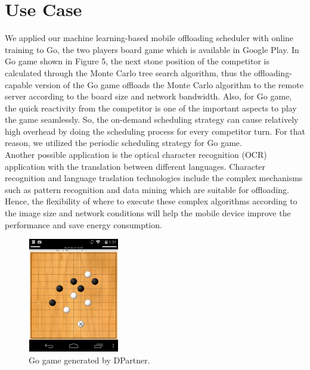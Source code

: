 \documentclass[10pt, conference, compsocconf]{IEEEtran}
\begin{document}
{\section{Use Case}
%
We applied our machine learning-based mobile offloading scheduler with
online training to Go, the two players board game which is available in
Google Play.
%
In Go game shown in Figure 5, the next stone position of the competitor
is calculated through the Monte Carlo tree search algorithm, thus the
offloading-capable version of the Go game offloads the Monte Carlo
algorithm to the remote server according to the board size and network
bandwidth.
%
Also, for Go game, the quick reactivity from the competitor is one of
the important aspects to play the game seamlessly.
%
So, the on-demand scheduling strategy can cause relatively high overhead
by doing the scheduling process for every competitor turn.
%
For that reason, we utilized the periodic scheduling strategy for Go
game.\\
%
\indent Another possible application is the optical character
recognition (OCR) application with the translation between different
languages.
%
Character recognition and language traslation technologies include
the complex mechanisms such as pattern recognition and data mining which
are suitable for offloading.
%
Hence, the flexibility of where to execute these complex algorithms
according to the image size and network conditions will help the mobile
device improve the performance and save energy consumption.
%
\begin{figure}
\centering
\includegraphics[height=5.0cm, width=4.0cm]{Figure/figure7}
\caption{Go game generated by DPartner.}
\end{figure}
%
}
\end{document}
